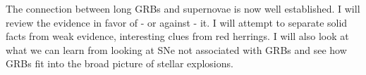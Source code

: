 


\bigskip



\bigskip

\noindent The connection between long GRBs and supernovae is now well established. I will review the evidence in favor of - or against - it. I will attempt to separate solid facts from  weak evidence, interesting clues from red herrings. I will also look at what we  can learn from looking at SNe not associated with GRBs and see how GRBs fit into the broad picture of stellar explosions.
